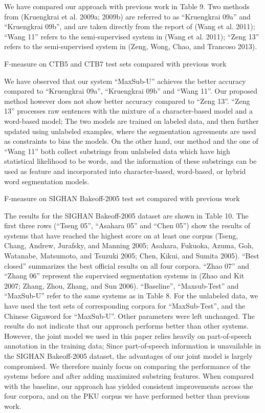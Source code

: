 \documentclass[english]{jnlp_1.4}
\begin{document}
We have compared our approach with previous work in Table 9. Two methods from (Kruengkrai et al. 2009a; 2009b) are referred to as ``Kruengkrai 09a'' and ``Kruengkrai 09b'', and are taken directly from the report of (Wang et al. 2011); ``Wang 11'' refers to the semi-supervised system in (Wang et al. 2011); ``Zeng 13'' refers to the semi-supervised system in (Zeng, Wong, Chao, and Trancoso 2013). 

\begin{table}[b]
\caption{F-measure on CTB5 and CTB7 test sets compared with previous work}

\end{table}

We have observed that our system ``MaxSub-U'' achieves the better accuracy compared to ``Kruengkrai 09a'', ``Kruengkrai 09b'' and ``Wang 11''. Our proposed method however does not show better accuracy compared to ``Zeng 13''. ``Zeng 13'' processes raw sentences with the mixture of a character-based model and a word-based model; The two models are trained on labeled data, and then further updated using unlabeled examples, where the segmentation agreements are used as constraints to bias the models. On the other hand, our method and the one of ``Wang 11'' both collect substrings from unlabeled data which have high statistical likelihood to be words, and the information of these substrings can be used as feature and incorporated into character-based, word-based, or hybrid word segmentation models. 

\begin{table}[b]
\caption{F-measure on SIGHAN Bakeoff-2005 test set compared with previous work}

\end{table}

The results for the SIGHAN Bakeoff-2005 dataset are shown in Table 10. The first three rows (``Tseng 05'', ``Asahara 05'' and ``Chen 05'') show the results of systems that have reached the highest score on at least one corpus (Tseng, Chang, Andrew, Jurafsky, and Manning 2005; Asahara, Fukuoka, Azuma, Goh, Watanabe, Matsumoto, and Tsuzuki 2005; Chen, Kikui, and Sumita 2005). ``Best closed'' summarizes the best official results on all four corpora. ``Zhao 07'' and ``Zhang 06'' represent the supervised segmentation systems in (Zhao and Kit 2007; Zhang, Zhou, Zhang, and Sun 2006). ``Baseline'', ``Maxsub-Test'' and ``MaxSub-U'' refer to the same systems as in Table 8. For the unlabeled data, we have used the test sets of corresponding corpora for ``MaxSub-Test'', and the Chinese Gigaword for ``MaxSub-U''. Other parameters were left unchanged. The results do not indicate that our approach performs better than other systems. However, the joint model we used in this paper relies heavily on part-of-speech annotation in the training data; Since part-of-speech information is unavailable in the SIGHAN Bakeoff-2005 dataset, the advantages of our joint model is largely compromised. We therefore mainly focus on comparing the performance of the systems before and after adding maximized substring features. When compared with the baseline, our approach has yielded consistent improvements across the four corpora, and on the PKU corpus we have performed better than previous work. 
\end{document}
